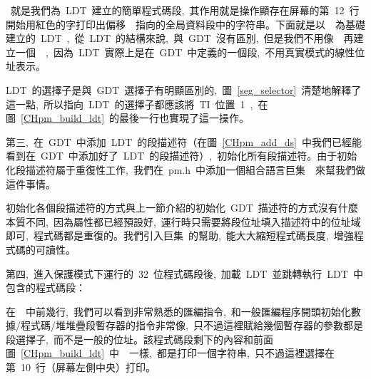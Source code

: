 ~就是我們為~LDT~建立的簡單程式碼段,~其作用就是操作顯存在屏幕的第~12~行開始用紅色的字打印出偏移~~指向的全局資料段中的字符串。下面就是以~~為基礎建立的~LDT~,~從~LDT~的結構來說,~與~GDT~沒有區別,~但是我們不用像~~再建立一個~~,~因為~LDT~實際上是在~GDT~中定義的一個段,~不用真實模式的線性位址表示。

LDT~的選擇子是與~GDT~選擇子有明顯區別的,~圖~\ref{seg_selector}~清楚地解釋了這一點,~所以指向~LDT~的選擇子都應該將~TI~位置~1~,~在圖~\ref{CHpm_build_ldt}~的最後一行也實現了這一操作。

第三,~在~GDT~中添加~LDT~的段描述符（在圖~\ref{CHpm_add_ds}~中我們已經能看到在~GDT~中添加好了~LDT~的段描述符）,~初始化所有段描述符。由于初始化段描述符屬于重復性工作,~我們在~pm.h~中添加一個組合語言巨集~~來幫我們做這件事情。

\label{CHpm_initdesc}

\label{CHpm_init_dts}

初始化各個段描述符的方式與上一節介紹的初始化~GDT~描述符的方式沒有什麼本質不同,~因為屬性都已經預設好,~運行時只需要將段位址填入描述符中的位址域即可,~程式碼都是重復的。我們引入巨集~的幫助,~能大大縮短程式碼長度,~增強程式碼的可讀性。

第四,~進入保護模式下運行的~32~位程式碼段後,~加載~LDT~並跳轉執行~LDT~中包含的程式碼段：

\label{CHpm_run_ldt}

在~~中前幾行,~我們可以看到非常熟悉的匯編指令,~和一般匯編程序開頭初始化數據/程式碼/堆堆疊段暫存器的指令非常像,~只不過這裡賦給幾個暫存器的參數都是段選擇子,~而不是一般的位址。該程式碼段剩下的內容和前面圖~\ref{CHpm_build_ldt}~中~~一樣,~都是打印一個字符串,~只不過這裡選擇在第~10~行（屏幕左側中央）打印。

